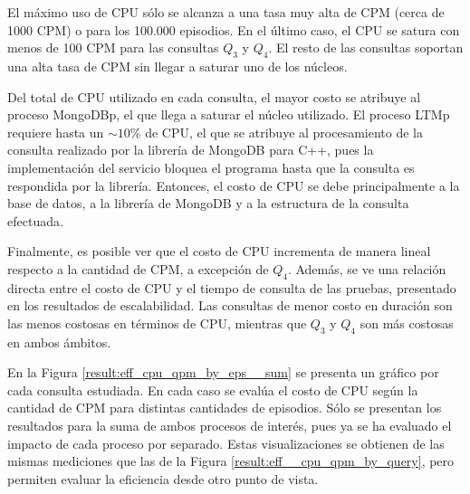 El máximo uso de CPU sólo se alcanza a una tasa muy alta de CPM (cerca de 1000 CPM) o para los 100.000 episodios. En el último caso, el CPU se satura con menos de 100 CPM para las consultas $Q_3$ y $Q_4$. El resto de las consultas soportan una alta tasa de CPM sin llegar a saturar uno de los núcleos.

Del total de CPU utilizado en cada consulta, el mayor costo se atribuye al proceso MongoDBp, el que llega a saturar el núcleo utilizado. El proceso LTMp requiere hasta un $\sim10\%$ de CPU, el que se atribuye al procesamiento de la consulta realizado por la librería de MongoDB para C++, pues la implementación del servicio bloquea el programa hasta que la consulta es respondida por la librería. Entonces, el costo de CPU se debe principalmente a la base de datos, a la librería de MongoDB y a la estructura de la consulta efectuada.

Finalmente, es posible ver que el costo de CPU incrementa de manera lineal  respecto a la cantidad de CPM, a excepción de $Q_4$. Además, se ve una relación directa entre el costo de CPU y el tiempo de consulta de las pruebas, presentado en los resultados de escalabilidad. Las consultas de menor costo en duración son las menos costosas en términos de CPU, mientras que $Q_3$ y $Q_4$ son más costosas en ambos ámbitos.





 En la Figura \ref{result:eff_cpu_qpm_by_eps__sum} se presenta un gráfico por cada consulta estudiada. En cada caso se evalúa el costo de CPU según la cantidad de CPM para distintas cantidades de episodios. Sólo se presentan los resultados para la suma de ambos procesos de interés, pues ya se ha evaluado el impacto de cada proceso por separado. Estas visualizaciones se obtienen de las mismas mediciones que las de la Figura \ref{result:eff__cpu_qpm_by_query}, pero permiten evaluar la eficiencia desde otro punto de vista.


